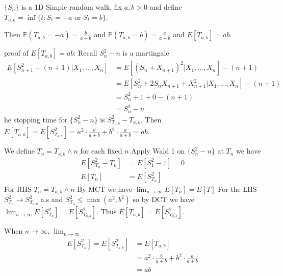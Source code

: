 \documentclass[answers,12pt,addpoints]{exam}
\begin{document}
\begin{example}
    $\{S_n\}$ is a 1D Simple random walk, fix $a,b >0$ and define $T_{a,b} = \inf\{t : S_t = -a \text{ or } S_t = b\}$. 

    Then $\mathbb{P}(T_{a,b} = -a) = \frac{b}{a+b}$ and $\mathbb{P}(T_{a,b} = b) = \frac{a}{a+b}$ and $E[T_{a,b}] = ab$.

    proof of $E[T_{a,b}] = ab$: Recall $S_n^2 - n$ is a martingale 
    \begin{align*}
        E[S_{n+1}^2 - (n+1) | X_1, \ldots, X_n] &= E[(S_n + X_{n+1})^2| X_1, \ldots, X_n] - (n+1) \\
        &= E[S_n^2 + 2S_nX_{n+1} + X_{n+1}^2 | X_1, \ldots, X_n] - (n+1) \\
        &= S_n^2 + 1 + 0 - (n+1) \\
        &= S_n^2 - n
    \end{align*}
    he stopping time for $\{S_n^2 - n\}$ is $S_{T_{a,b}}^2 - T_{a,b}$. Then $E[T_{a,b}] = E[S_{T_{a,b}}^2] = a^2 \cdot \frac{b}{a+b} + b^2 \cdot \frac{a}{a+b} = ab$.

    We define $T_n = T_{a,b} \wedge n$ for each fixed $n$ Apply Wald 1 on $\{S_n^2 - n\}$ at $T_n$ we have 
    \begin{align*}
        E[S_{T_n}^2 - T_n] &= E[S_1^2 - 1] = 0 \\
        E[T_n] &= E[S_{T_n}^2]
    \end{align*}
    For RHS $T_n = T_{a,b} \wedge n$ By MCT we have $\lim_{n \to \infty} E[T_n] = E[T]$ For the LHS $S_{T_n}^2 \to S_{T_{a,b}}^2$ a.s and $S_{T_n}^2 \leq \max(a^2, b^2)$ so by DCT we have $\lim_{n \to \infty} E[S_{T_n}^2] = E[S_{T_{a,b}}^2]$. Thus $E[T_{a,b}] = E[S_{T_{a,b}}^2]$.

    When $n \to \infty$, $\lim_{n \to \infty}$
    \begin{align*}
        E[S_{T_{n}}^2] = E[S_{T_{a,b}}^2] &= E[T_{a,b}] \\
        &= a^2 \cdot \frac{b}{a+b} + b^2 \cdot \frac{a}{a+b} \\
        &= ab
    \end{align*}
\end{example}
\end{document}
